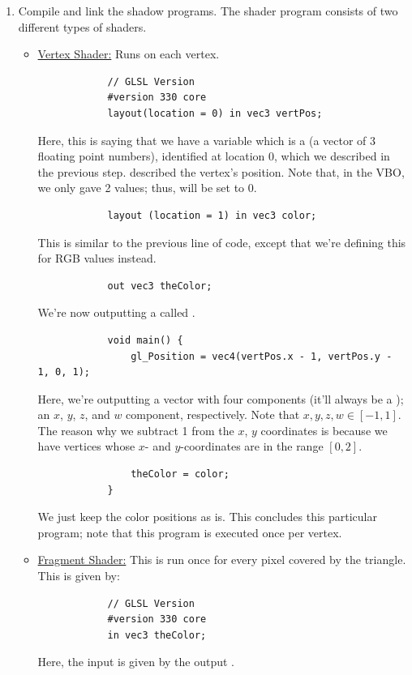 \documentclass[letterpaper]{article}
\begin{document}
\begin{enumerate}
    \item Compile and link the shadow programs. The shader program consists of two different types of shaders.
    \begin{itemize}
        \item \underline{Vertex Shader:} Runs on each vertex. 
        \begin{verbatim}
            // GLSL Version 
            #version 330 core     
            layout(location = 0) in vec3 vertPos;\end{verbatim}
        Here, this is saying that we have a variable  which is a  (a vector of 3 floating point numbers), identified at location 0, which we described in the previous step.  described the vertex's position. Note that, in the VBO, we only gave 2 values; thus,  will be set to 0.
        
        \begin{verbatim}
            layout (location = 1) in vec3 color;\end{verbatim}
        This is similar to the previous line of code, except that we're defining this for RGB values instead. 

        \begin{verbatim}
            out vec3 theColor;\end{verbatim}
        We're now outputting a  called .

        \begin{verbatim}
            void main() {
                gl_Position = vec4(vertPos.x - 1, vertPos.y - 1, 0, 1);
            \end{verbatim}
        Here, we're outputting a vector with four components (it'll always be a ); an $x$, $y$, $z$, and $w$ component, respectively. Note that $x, y, z, w \in [-1, 1]$. The reason why we subtract 1 from the $x$, $y$ coordinates is because we have vertices whose $x$- and $y$-coordinates are in the range $[0, 2]$. 

        \begin{verbatim}
                theColor = color;
            } \end{verbatim}
        We just keep the color positions as is. This concludes this particular program; note that this program is executed once per vertex. 

        \item \underline{Fragment Shader:} This is run once for every pixel covered by the triangle. This is given by: 
        \begin{verbatim}
            // GLSL Version 
            #version 330 core
            in vec3 theColor; \end{verbatim}
        Here, the input  is given by the output . 


\end{itemize}
\end{enumerate}
\end{document}
